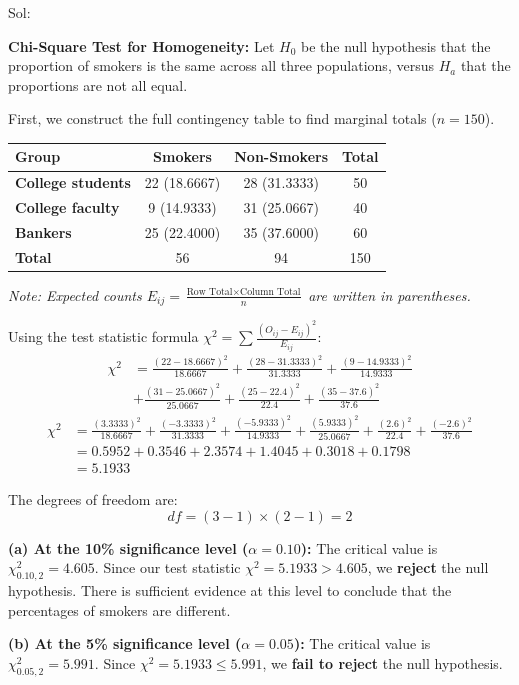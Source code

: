 \documentclass[11pt,svgnames,spanish,oneside]{amsart}
\newenvironment{mysolution}{%
  \solution\color{blue}Sol:
}{%
  \endsolution
}
\begin{document}
\begin{mysolution}
    \textbf{Chi-Square Test for Homogeneity:}
    Let $H_0$ be the null hypothesis that the proportion of smokers is the same across all three populations, versus $H_a$ that the proportions are not all equal.

    First, we construct the full contingency table to find marginal totals ($n = 150$).

    \begin{center}
    \renewcommand{\arraystretch}{1.15}
    \begin{tabular}{lccc}
    \hline
    \textbf{Group} & \textbf{Smokers} & \textbf{Non-Smokers} & \textbf{Total} \\ \hline
    \textbf{College students} & 22 (18.6667) & 28 (31.3333) & 50 \\
    \textbf{College faculty}  & 9 (14.9333)  & 31 (25.0667) & 40 \\
    \textbf{Bankers}          & 25 (22.4000) & 35 (37.6000) & 60 \\ \hline
    \textbf{Total}            & 56           & 94           & 150 \\ \hline
    \end{tabular}
    \end{center}
    \nopagebreak\textit{Note: Expected counts $E_{ij} = \frac{\text{Row Total} \times \text{Column Total}}{n}$ are written in parentheses.}

    Using the test statistic formula $\chi^2 = \sum \frac{(O_{ij} - E_{ij})^2}{E_{ij}}$:
    \begin{align*}
    \chi^2 &= \frac{(22-18.6667)^2}{18.6667} + \frac{(28-31.3333)^2}{31.3333} + \frac{(9-14.9333)^2}{14.9333} \\
           &+ \frac{(31-25.0667)^2}{25.0667} + \frac{(25-22.4)^2}{22.4} + \frac{(35-37.6)^2}{37.6}
    \end{align*}
    \begin{align*}
    \chi^2 &= \frac{(3.3333)^2}{18.6667} + \frac{(-3.3333)^2}{31.3333} + \frac{(-5.9333)^2}{14.9333} + \frac{(5.9333)^2}{25.0667} + \frac{(2.6)^2}{22.4} + \frac{(-2.6)^2}{37.6} \\
           &= 0.5952 + 0.3546 + 2.3574 + 1.4045 + 0.3018 + 0.1798 \\
           &= 5.1933
    \end{align*}

    The degrees of freedom are:
    \[
    df = (3 - 1) \times (2 - 1) = 2
    \]

    \textbf{(a) At the 10\% significance level ($\alpha = 0.10$):}
    The critical value is $\chi^2_{0.10, 2} = 4.605$. Since our test statistic $\chi^2 = 5.1933 > 4.605$, we \textbf{reject} the null hypothesis. There is sufficient evidence at this level to conclude that the percentages of smokers are different.

    \textbf{(b) At the 5\% significance level ($\alpha = 0.05$):}
    The critical value is $\chi^2_{0.05, 2} = 5.991$. Since $\chi^2 = 5.1933 \le 5.991$, we \textbf{fail to reject} the null hypothesis.

\end{mysolution}
\end{document}
